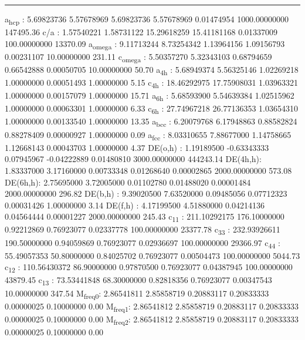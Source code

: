 \documentclass[11pt]{article}
\begin{document}
\noindent\rule{\textwidth}{0.5pt}
a\textsubscript{hcp}   :   5.69823736   5.57678969   5.69823736   5.57678969   0.01474954 1000.00000000    147495.36
c/a     :   1.57540221   1.58731122  15.29618259  15.41181168   0.01337009 100.00000000     13370.09
a\textsubscript{omega} :   9.11713244   8.73254342   1.13964156   1.09156793   0.00231107  10.00000000       231.11
c\textsubscript{omega} :   5.50357270   5.32343103   0.68794659   0.66542888   0.00050705  10.00000000        50.70
a\textsubscript{4h}    :   5.68949374   5.56325146   1.02269218   1.00000000   0.00051493   1.00000000         5.15
c\textsubscript{4h}    :  18.46292975  17.75908031   1.03963321   1.00000000   0.00157079   1.00000000        15.71
a\textsubscript{6h}    :   5.68593900   5.54639384   1.02515962   1.00000000   0.00063301   1.00000000         6.33
c\textsubscript{6h}    :  27.74967218  26.77136353   1.03654310   1.00000000   0.00133540   1.00000000        13.35
a\textsubscript{bcc}   :   6.20079768   6.17948863   0.88582824   0.88278409   0.00000927   1.00000000         0.09
a\textsubscript{fcc}   :   8.03310655   7.88677000   1.14758665   1.12668143   0.00043703   1.00000000         4.37
DE(o,h) :   1.19189500  -0.63343333   0.07945967  -0.04222889   0.01480810 3000.00000000    444243.14
DE(4h,h):   1.83337000   3.17160000   0.00733348   0.01268640   0.00002865 2000.00000000       573.08
DE(6h,h):   2.75695000   3.72005000   0.01102780   0.01488020   0.00001484 2000.00000000       296.82
DE(b,h) :   9.39020500   7.63520000   0.09485056   0.07712323   0.00031426   1.00000000         3.14
DE(f,h) :   4.17199500   4.51880000   0.04214136   0.04564444   0.00001227 2000.00000000       245.43
c\textsubscript{11}    : 211.10292175 176.10000000   0.92212869   0.76923077   0.02337778 100.00000000     23377.78
c\textsubscript{33}    : 232.93926611 190.50000000   0.94059869   0.76923077   0.02936697 100.00000000     29366.97
c\textsubscript{44}    :  55.49057353  50.80000000   0.84025702   0.76923077   0.00504473 100.00000000      5044.73
c\textsubscript{12}    : 110.56430372  86.90000000   0.97870500   0.76923077   0.04387945 100.00000000     43879.45
c\textsubscript{13}    :  73.53441848  68.30000000   0.82818356   0.76923077   0.00347543  10.00000000       347.54
M\textsubscript{freq}\textsubscript{0}:   2.86541811   2.85858719   0.20883117   0.20833333   0.00000025   0.10000000         0.00
M\textsubscript{freq}\textsubscript{1}:   2.86541812   2.85858719   0.20883117   0.20833333   0.00000025   0.10000000         0.00
M\textsubscript{freq}\textsubscript{2}:   2.86541812   2.85858719   0.20883117   0.20833333   0.00000025   0.10000000         0.00
\end{document}
